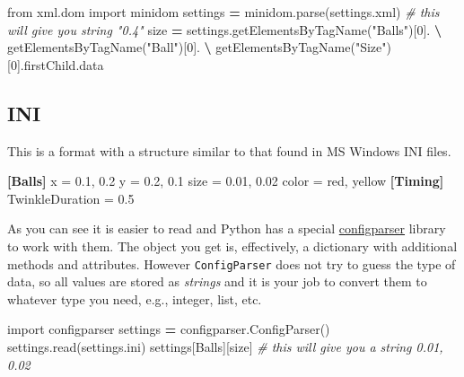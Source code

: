 \documentclass[
]{book}
\newenvironment{Shaded}{\begin{snugshade}}{\end{snugshade}}
\newcommand{\CommentTok}[1]{\textcolor[rgb]{0.56,0.35,0.01}{\textit{#1}}}
\newcommand{\DataTypeTok}[1]{\textcolor[rgb]{0.13,0.29,0.53}{#1}}
\newcommand{\DecValTok}[1]{\textcolor[rgb]{0.00,0.00,0.81}{#1}}
\newcommand{\FloatTok}[1]{\textcolor[rgb]{0.00,0.00,0.81}{#1}}
\newcommand{\ImportTok}[1]{#1}
\newcommand{\KeywordTok}[1]{\textcolor[rgb]{0.13,0.29,0.53}{\textbf{#1}}}
\newcommand{\NormalTok}[1]{#1}
\newcommand{\OperatorTok}[1]{\textcolor[rgb]{0.81,0.36,0.00}{\textbf{#1}}}
\newcommand{\OtherTok}[1]{\textcolor[rgb]{0.56,0.35,0.01}{#1}}
\newcommand{\StringTok}[1]{\textcolor[rgb]{0.31,0.60,0.02}{#1}}
\begin{document}
\begin{Shaded}
\begin{Highlighting}[]
\ImportTok{from}\NormalTok{ xml.dom }\ImportTok{import}\NormalTok{ minidom}
\NormalTok{settings }\OperatorTok{=}\NormalTok{ minidom.parse(}\StringTok{\textquotesingle{}settings.xml\textquotesingle{}}\NormalTok{)}
\CommentTok{\# this will give you string "0.4"}
\NormalTok{size }\OperatorTok{=}\NormalTok{ settings.getElementsByTagName(}\StringTok{"Balls"}\NormalTok{)[}\DecValTok{0}\NormalTok{]. }\OperatorTok{\textbackslash{}}
\NormalTok{                getElementsByTagName(}\StringTok{"Ball"}\NormalTok{)[}\DecValTok{0}\NormalTok{]. }\OperatorTok{\textbackslash{}}
\NormalTok{                getElementsByTagName(}\StringTok{"Size"}\NormalTok{)[}\DecValTok{0}\NormalTok{].firstChild.data}
\end{Highlighting}
\end{Shaded}

\hypertarget{ini}{%
\subsection{INI}\label{ini}}

This is a format with a structure similar to that found in MS Windows INI files.

\begin{Shaded}
\begin{Highlighting}[]
\KeywordTok{[Balls]}
\DataTypeTok{    x }\OtherTok{=}\StringTok{ 0.1, 0.2}
\DataTypeTok{    y }\OtherTok{=}\StringTok{ 0.2, 0.1}
\DataTypeTok{    size }\OtherTok{=}\StringTok{ 0.01, 0.02}
\DataTypeTok{    color }\OtherTok{=}\StringTok{ red, yellow}
\KeywordTok{[Timing]}
\DataTypeTok{    TwinkleDuration }\OtherTok{=}\StringTok{ }\FloatTok{0.5}
\end{Highlighting}
\end{Shaded}

As you can see it is easier to read and Python has a special \href{https://docs.python.org/3/library/configparser.html}{configparser} library to work with them. The object you get is, effectively, a dictionary with additional methods and attributes. However \texttt{ConfigParser} does not try to guess the type of data, so all values are stored as \emph{strings} and it is your job to convert them to whatever type you need, e.g., integer, list, etc.

\begin{Shaded}
\begin{Highlighting}[]
\ImportTok{import}\NormalTok{ configparser}
\NormalTok{settings }\OperatorTok{=}\NormalTok{ configparser.ConfigParser()}
\NormalTok{settings.read(}\StringTok{\textquotesingle{}settings.ini\textquotesingle{}}\NormalTok{)}
\NormalTok{settings[}\StringTok{\textquotesingle{}Balls\textquotesingle{}}\NormalTok{][}\StringTok{\textquotesingle{}size\textquotesingle{}}\NormalTok{] }\CommentTok{\# this will give you a string \textquotesingle{}0.01, 0.02\textquotesingle{}}
\end{Highlighting}
\end{Shaded}
\end{document}
